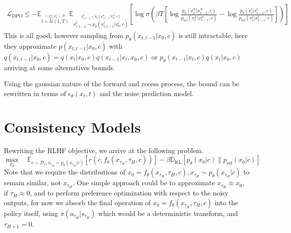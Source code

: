 \documentclass[10pt]{article}
\begin{document}
\begin{gather}
	\mathcal{L}_\text{DPO}\leq-\mathbb{E}_{\stackrel{c,x_0^w,x_0^l\sim\mathcal{D}}{t\sim\mathcal{U}(1,T)}}\mathbb{E}_{
	\stackrel{{x_{t,t-1}^w\sim p_\theta(x_{t,t-1}^w|x_0^w,c)}}{x_{t,t-1}^l\sim p_\theta(x_{t,t-1}^l|x_0^l,c)}}\left[\log\sigma\left(\beta T\left[\log\frac{p_\theta(x_{t}^w|x_{t-1}^w,c)}{p_\text{ref}(x_{t}^w|x_{t-1}^w,c)}-\log\frac{p_\theta(x_{t}^l|x_{t-1}^l,c)}{p_\text{ref}(x_{t}^l|x_{t-1}^l,c)}\right]\right)\right]
\end{gather}
This is all good, however sampling from $p_\theta(x_{t,t-1}|x_0,c)$ is still intractable, here they approximate $p(x_{t,t-1}|x_0,c)$ with $q(x_{t,t-1}|x_0,c)=q(x_t|x_0,c)q(x_{t-1}|x_t,x_0,c)$ or $p_\theta(x_{t-1}|x_t,c)q(x_t|x_0,c)$ arriving at some alternatives bounds.

Using the gaussian nature of the forward and recess process, the bound can be rewritten in terms of $\epsilon_\theta(x_t,t)$ and the noise prediction model.

\section{Consistency Models}

Rewriting the RLHF objective, we arrive at the following problem.
\begin{equation}
	\max_{p_\theta}\quad\mathbb{E}_{c\sim \mathcal{D}_c,x_{\tau_H}\sim p_\theta(x_{\tau_H}|c)}\left[r(c,f_\theta(x_{\tau_H},{\tau_H},c))\right]-\beta\mathbb{D}_\text{KL}\left[p_\theta(x_0|c)\|p_\text{ref}(x_0|c)\right]
\end{equation}
Note that we require the distributions of $x_0=f_\theta(x_{\tau_H},{\tau_H},c), x_{\tau_H}\sim p_\theta(x_{\tau_H}|c)$ to remain similar, not $x_{\tau_H}$. One simple approach could be to approximate $x_{\tau_H}\approx x_0$, if $\tau_H\approx0$, and to perform preference optimization with respect to the noisy outputs,
for now we absorb the final operation of $x_0=f_\theta(x_{\tau_H},{\tau_H},c)$ into the policy itself, using $\pi(a_{\tau_H}|s_{\tau_H})$ which would be a deterministic transform, and $\tau_{H+1}=0$.
\end{document}
